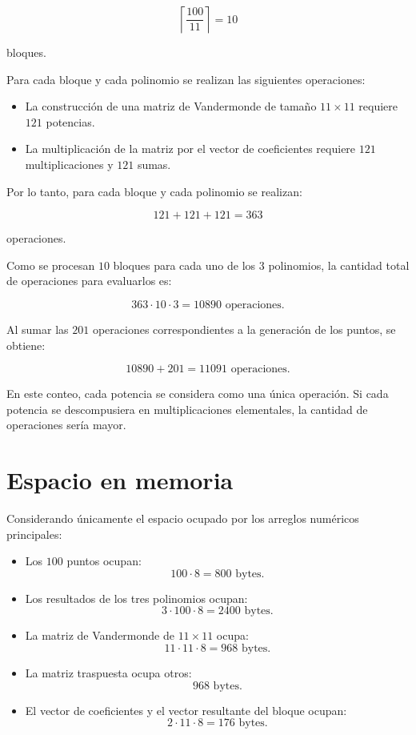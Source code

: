 \documentclass[12pt,a4paper]{article}
\begin{document}
\[
\left\lceil\frac{100}{11}\right\rceil = 10
\]

bloques.

Para cada bloque y cada polinomio se realizan las siguientes operaciones:

\begin{itemize}
    \item La construcción de una matriz de Vandermonde de tamaño $11\times11$ requiere $121$ potencias.
    \item La multiplicación de la matriz por el vector de coeficientes requiere $121$ multiplicaciones y $121$ sumas.
\end{itemize}

Por lo tanto, para cada bloque y cada polinomio se realizan:

\[
121+121+121=363
\]

operaciones.

Como se procesan $10$ bloques para cada uno de los $3$ polinomios, la cantidad total de operaciones para evaluarlos es:

\[
363\cdot10\cdot3
=
\boxed{10890\text{ operaciones}}.
\]

Al sumar las $201$ operaciones correspondientes a la generación de los puntos, se obtiene:

\[
10890+201
=
\boxed{11091\text{ operaciones}}.
\]

En este conteo, cada potencia se considera como una única operación. Si cada potencia se descompusiera en multiplicaciones elementales, la cantidad de operaciones sería mayor.

\section*{Espacio en memoria}

Considerando únicamente el espacio ocupado por los arreglos numéricos principales:

\begin{itemize}
    \item Los $100$ puntos ocupan:
    \[
    100\cdot8=800\text{ bytes}.
    \]

    \item Los resultados de los tres polinomios ocupan:
    \[
    3\cdot100\cdot8=2400\text{ bytes}.
    \]

    \item La matriz de Vandermonde de $11\times11$ ocupa:
    \[
    11\cdot11\cdot8=968\text{ bytes}.
    \]

    \item La matriz traspuesta ocupa otros:
    \[
    968\text{ bytes}.
    \]

    \item El vector de coeficientes y el vector resultante del bloque ocupan:
    \[
    2\cdot11\cdot8=176\text{ bytes}.
    \]
\end{itemize}
\end{document}
